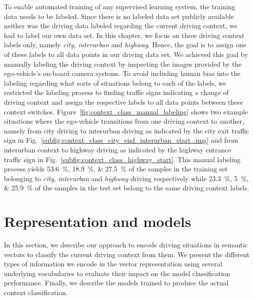 To enable automated training of any supervised learning system, the training data needs to be labeled. 
Since there is no labeled data set publicly available neither was the driving data labeled regarding the current driving context, we had to label our own data set.
In this chapter, we focus on three driving context labels only, namely \emph{city}, \emph{interurban} and \emph{highway}.
Hence, the goal is to assign one of these labels to all data points in our driving data set.
We achieved this goal by manually labeling the driving context by inspecting the images provided by the ego-vehicle's on-board camera systems.
To avoid including human bias into the labeling regarding what sorts of situations belong to each of the labels, we restricted the labeling process to finding traffic signs indicating a change of driving context and assign the respective labels to all data points between these context switches.
Figure~\ref{fig:context_class_manual_labeling} shows two example situations where the ego-vehicle transitions from one driving context to another, namely from city driving to interurban driving as indicated by the city exit traffic sign in Fig.~\ref{subfig:context_class_city_end_interurban_start_img} and from interurban context to highway driving as indicated by the highway entrance traffic sign in Fig.~\ref{subfig:context_class_highway_start}.
This manual labeling process yields \SIlist{53.6;18.9;27.5}{\percent} of the samples in the training set belonging to \emph{city}, \emph{interurban} and \emph{highway} driving respectively while \SIlist{23.3;5;25.9}{\percent} of the samples in the test set belong to the same driving context labels.

\section{Representation and models}%
\label{sec:representation_and_modelsi_context_classification}

In this section, we describe our approach to encode driving situations in semantic vectors to classify the current driving context from them.
We present the different types of information we encode in the vector representation using several underlying vocabularies to evaluate their impact on the model classification performance.
Finally, we describe the models trained to produce the actual context classification.


